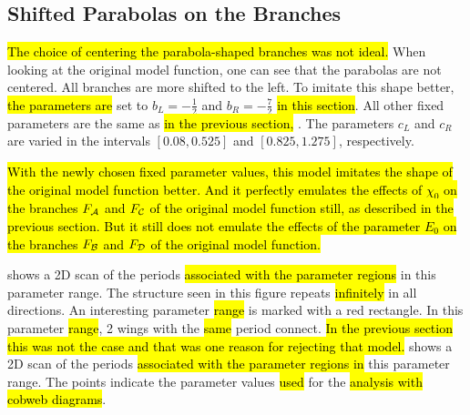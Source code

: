 \subsection{Shifted Parabolas on the Branches}
\label{sec:setup.quad.skewed}

\hl{
	The choice of centering the parabola-shaped branches was not ideal.
}
When looking at the original model function, one can see that the parabolas are not centered.
All branches are more shifted to the left.
To imitate this shape better, \hl{the parameters are} set to $b_L = -\frac{1}{2}$ and $b_R = -\frac{7}{2}$ \hl{in this section}.
All other fixed parameters are the same as \hl{in the previous section,} .
The parameters $c_L$ and $c_R$ are varied in the intervals $[0.08, 0.525]$ and $[0.825, 1.275]$, respectively.

\hl{
	With the newly chosen fixed parameter values, this model imitates the shape of the original model function better.
	And it perfectly emulates the effects of $\chi_0$ on the branches $F_{\mathcal{A}}$ and $F_{\mathcal{C}}$ of the original model function still, as described in the previous section.
	But it still does not emulate the effects of the parameter $E_0$ on the branches $F_{\mathcal{B}}$ and $F_{\mathcal{D}}$ of the original model function.
}

 shows a 2D scan of the periods \hl{associated with the parameter regions} in this parameter range.
The structure seen in this figure repeats \hl{infinitely} in all directions.
An interesting parameter \hl{range} is marked with a red rectangle.
In this parameter \hl{range}, 2 wings with the \hl{same} period connect.
\hl{
	In the previous section this was not the case and that was one reason for rejecting that model.
}
 shows a 2D scan of the periods \hl{associated with the parameter regions in} this parameter range.
The points indicate the parameter values \hl{used} for the \hl{analysis with cobweb diagrams}.

